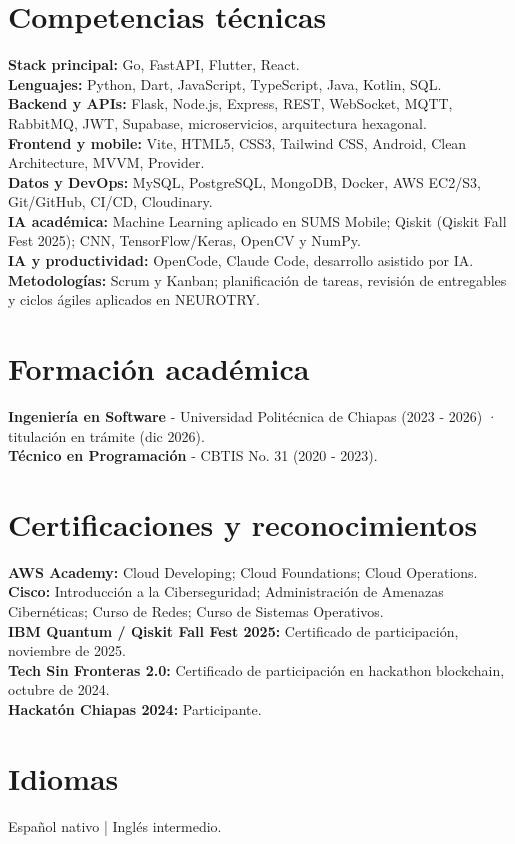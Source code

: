 \documentclass[9pt,letterpaper]{article}
\begin{document}
\section*{Competencias técnicas}
\textbf{Stack principal:} Go, FastAPI, Flutter, React.\\
\textbf{Lenguajes:} Python, Dart, JavaScript, TypeScript, Java, Kotlin, SQL.\\
\textbf{Backend y APIs:} Flask, Node.js, Express, REST, WebSocket, MQTT, RabbitMQ, JWT, Supabase, microservicios, arquitectura hexagonal.\\
\textbf{Frontend y mobile:} Vite, HTML5, CSS3, Tailwind CSS, Android, Clean Architecture, MVVM, Provider.\\
\textbf{Datos y DevOps:} MySQL, PostgreSQL, MongoDB, Docker, AWS EC2/S3, Git/GitHub, CI/CD, Cloudinary.\\
\textbf{IA académica:} Machine Learning aplicado en SUMS Mobile; Qiskit (Qiskit Fall Fest 2025); CNN, TensorFlow/Keras, OpenCV y NumPy.\\
\textbf{IA y productividad:} OpenCode, Claude Code, desarrollo asistido por IA.\\
\textbf{Metodologías:} Scrum y Kanban; planificación de tareas, revisión de entregables y ciclos ágiles aplicados en NEUROTRY.

\section*{Formación académica}
\textbf{Ingeniería en Software} - Universidad Politécnica de Chiapas (2023 - 2026) · titulación en trámite (dic 2026).\\
\textbf{Técnico en Programación} - CBTIS No. 31 (2020 - 2023).

\section*{Certificaciones y reconocimientos}
\textbf{AWS Academy:} Cloud Developing; Cloud Foundations; Cloud Operations.\\
\textbf{Cisco:} Introducción a la Ciberseguridad; Administración de Amenazas Cibernéticas; Curso de Redes; Curso de Sistemas Operativos.\\
\textbf{IBM Quantum / Qiskit Fall Fest 2025:} Certificado de participación, noviembre de 2025.\\
\textbf{Tech Sin Fronteras 2.0:} Certificado de participación en hackathon blockchain, octubre de 2024.\\
\textbf{Hackatón Chiapas 2024:} Participante.

\section*{Idiomas}
Español nativo | Inglés intermedio.
\end{document}
